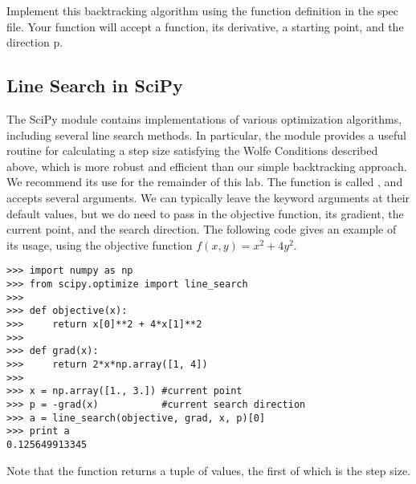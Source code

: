 \begin{problem}
Implement this backtracking algorithm using the function definition in the spec file.
Your function will accept a function, its derivative, a starting point, and the direction p.
\end{problem}

\subsection*{Line Search in SciPy}
The SciPy module  contains implementations of various optimization algorithms, including several line search methods.
In particular, the module provides a useful routine for calculating a step size satisfying the Wolfe Conditions described above, which is more robust and efficient than our simple backtracking approach.
We recommend its use for the remainder of this lab.
The function is called , and accepts several arguments.
We can typically leave the keyword arguments at their default values, but we do need to pass in the objective function, its gradient, the current point, and the search direction.
The following code gives an example of its usage, using the objective function $f(x, y) = x^2+4y^2$.
\begin{lstlisting}
>>> import numpy as np
>>> from scipy.optimize import line_search
>>>
>>> def objective(x):
>>>     return x[0]**2 + 4*x[1]**2
>>>
>>> def grad(x):
>>>     return 2*x*np.array([1, 4])
>>>
>>> x = np.array([1., 3.]) #current point
>>> p = -grad(x)           #current search direction
>>> a = line_search(objective, grad, x, p)[0]
>>> print a
0.125649913345
\end{lstlisting}
Note that the function returns a tuple of values, the first of which is the step size.
